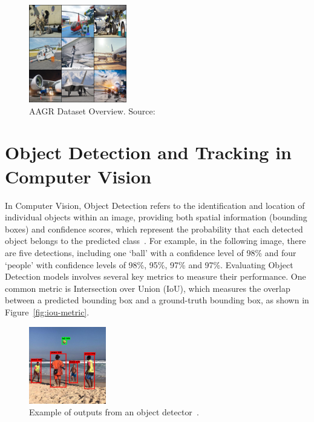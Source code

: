 \documentclass[12pt,oneside]{book} %
\begin{document}
\begin{figure}[H]
    \centering
    \includegraphics[width=0.38\textwidth]{figures/AGRDatasetGrid.png}
    \caption{AAGR Dataset Overview. Source: \citet{DatasetAGR}}\label{fig:agr-dataset}
\end{figure}


\newpage
\section{Object Detection and Tracking in Computer Vision}
In Computer Vision, Object Detection refers to the identification and location
of individual objects within an image, providing both spatial information
(bounding boxes) and confidence scores, which represent the probability that
each detected object belongs to the predicted
class~\cite{huggingface2023objectdetection}. For example, in the following
image, there are five detections, including one `ball' with a confidence level
of 98\% and four `people' with confidence levels of 98\%, 95\%, 97\% and 97\%.
Evaluating Object Detection models involves several key metrics to measure
their performance. One common metric is Intersection over Union (IoU), which
measures the overlap between a predicted bounding box and a ground-truth
bounding box, as shown in Figure~\ref{fig:iou-metric}.

\begin{figure}[H]
    \centering
    \includegraphics[width=0.3\textwidth]{figures/intro_object_detection.png}
    \caption{Example of outputs from an object detector~\cite{huggingface2023objectdetection}.}\label{fig:object-detection}
\end{figure}
\end{document}
